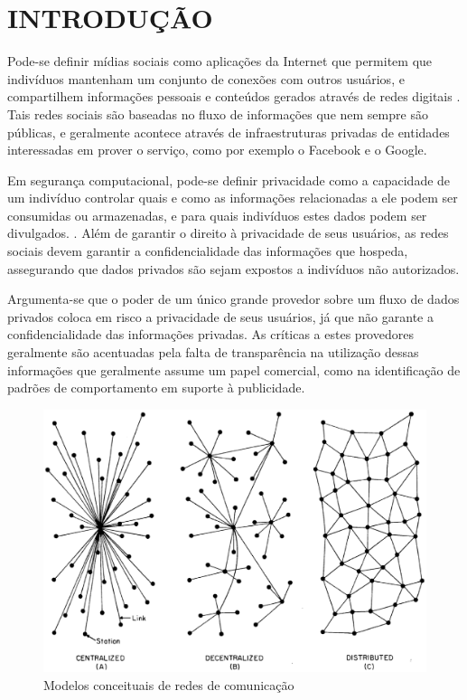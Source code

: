 \chapter{INTRODUÇÃO}

Pode-se definir mídias sociais como aplicações da Internet que permitem que
indivíduos mantenham um conjunto de conexões com outros usuários, e compartilhem
informações pessoais e conteúdos gerados através de redes digitais \cite{boyd2007}.
Tais redes sociais são baseadas no fluxo de informações que nem sempre são públicas,
e geralmente acontece através de infraestruturas privadas de entidades interessadas
em prover o serviço, como por exemplo o Facebook e o Google. 

Em segurança computacional, pode-se definir privacidade como a capacidade de um
indivíduo controlar quais e como as informações relacionadas a ele podem ser
consumidas ou armazenadas, e para quais indivíduos estes dados podem ser divulgados.
\cite{stallings2010}. Além de garantir o direito à privacidade de seus usuários,
as redes sociais devem garantir a confidencialidade das informações que hospeda,
assegurando que dados privados são sejam expostos a indivíduos não autorizados.

Argumenta-se que o poder de um único grande provedor sobre um fluxo de dados
privados coloca em risco a privacidade de seus usuários, já que não garante a
confidencialidade das informações privadas. As críticas a estes provedores
geralmente são acentuadas pela falta de transparência na utilização dessas
informações que geralmente assume um papel comercial, como na identificação de
padrões de comportamento em suporte à publicidade.

\begin{figure}[!htbp]
	\centering
		\includegraphics[keepaspectratio=true,scale=0.5]{figuras/org_redes.eps}
	\caption{Modelos conceituais de redes de comunicação \cite{baran1964}}
	\label{fig:org_redes}
\end{figure}

